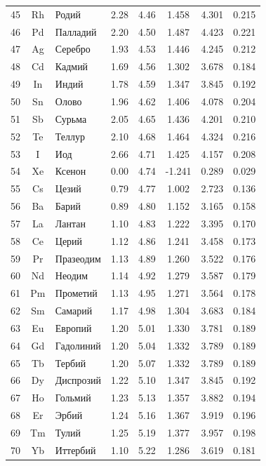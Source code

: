 \documentclass[12pt,a4paper]{article}
\theoremstyle{remark}
\begin{document}
\begin{longtable}{|c|c|p{2.5cm}|c|c|c|c|c|}
		45 & Rh & Родий & 2.28 & 4.46 & 1.458 & 4.301 & 0.215 \\
		46 & Pd & Палладий & 2.20 & 4.50 & 1.487 & 4.423 & 0.221 \\
		47 & Ag & Серебро & 1.93 & 4.53 & 1.446 & 4.245 & 0.212 \\
		48 & Cd & Кадмий & 1.69 & 4.56 & 1.302 & 3.678 & 0.184 \\
		49 & In & Индий & 1.78 & 4.59 & 1.347 & 3.845 & 0.192 \\
		50 & Sn & Олово & 1.96 & 4.62 & 1.406 & 4.078 & 0.204 \\
		51 & Sb & Сурьма & 2.05 & 4.65 & 1.436 & 4.201 & 0.210 \\
		52 & Te & Теллур & 2.10 & 4.68 & 1.464 & 4.324 & 0.216 \\
		53 & I & Иод & 2.66 & 4.71 & 1.425 & 4.157 & 0.208 \\
		54 & Xe & Ксенон & 0.00 & 4.74 & -1.241 & 0.289 & 0.029 \\
		55 & Cs & Цезий & 0.79 & 4.77 & 1.002 & 2.723 & 0.136 \\
		56 & Ba & Барий & 0.89 & 4.80 & 1.152 & 3.165 & 0.158 \\
		57 & La & Лантан & 1.10 & 4.83 & 1.222 & 3.395 & 0.170 \\
		58 & Ce & Церий & 1.12 & 4.86 & 1.241 & 3.458 & 0.173 \\
		59 & Pr & Празеодим & 1.13 & 4.89 & 1.260 & 3.522 & 0.176 \\
		60 & Nd & Неодим & 1.14 & 4.92 & 1.279 & 3.587 & 0.179 \\
		61 & Pm & Прометий & 1.13 & 4.95 & 1.271 & 3.564 & 0.178 \\
		62 & Sm & Самарий & 1.17 & 4.98 & 1.304 & 3.683 & 0.184 \\
		63 & Eu & Европий & 1.20 & 5.01 & 1.330 & 3.781 & 0.189 \\
		64 & Gd & Гадолиний & 1.20 & 5.04 & 1.332 & 3.789 & 0.189 \\
		65 & Tb & Тербий & 1.20 & 5.07 & 1.332 & 3.789 & 0.189 \\
		66 & Dy & Диспрозий & 1.22 & 5.10 & 1.347 & 3.845 & 0.192 \\
		67 & Ho & Гольмий & 1.23 & 5.13 & 1.357 & 3.882 & 0.194 \\
		68 & Er & Эрбий & 1.24 & 5.16 & 1.367 & 3.919 & 0.196 \\
		69 & Tm & Тулий & 1.25 & 5.19 & 1.377 & 3.957 & 0.198 \\
		70 & Yb & Иттербий & 1.10 & 5.22 & 1.286 & 3.619 & 0.181 \\

\end{longtable}
\end{document}

